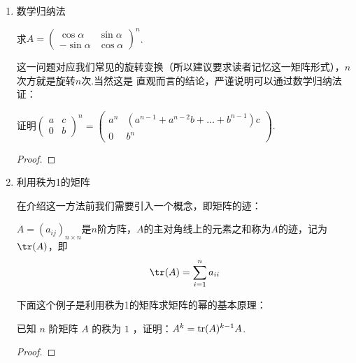 \begin{enumerate}
    \begin{solution}

    \end{solution}

    \item 数学归纳法
    \begin{example}
        求$A=\begin{pmatrix}\cos\alpha & \sin\alpha \\ -\sin\alpha & \cos\alpha\end{pmatrix}^n$.
    \end{example}
    这一问题对应我们常见的旋转变换（所以建议要求读者记忆这一矩阵形式），$n$次方就是旋转$n$次.当然这是
    直观而言的结论，严谨说明可以通过数学归纳法证：
    
    \begin{solution}

    \end{solution}

    \begin{example}
        证明$\begin{pmatrix}
            a & c \\ 0 & b
        \end{pmatrix}^n=\begin{pmatrix}
            a^n & (a^{n-1}+a^{n-2}b+\dots+b^{n-1})c \\ 0 & b^n
        \end{pmatrix}$.
    \end{example}
    \begin{proof}
        
    \end{proof}

    \item 利用秩为1的矩阵

    在介绍这一方法前我们需要引入一个概念，即矩阵的迹：
    \begin{definition}
        $A=(a_{ij})_{n\times n}$是$n$阶方阵，$A$的主对角线上的元素之和称为$A$的迹，记为$\tr(A)$，即
        \[\tr(A)=\sum_{i=1}^n a_{ii}\]
    \end{definition}

    下面这个例子是利用秩为1的矩阵求矩阵的幂的基本原理：
    \begin{lemma}
        已知 $n$ 阶矩阵 $A$ 的秩为 $1$ ，证明：$A^k=\textup{tr}(A)^{k-1}A$.
    \end{lemma}
    \begin{proof}
        
    \end{proof}


\end{enumerate}
